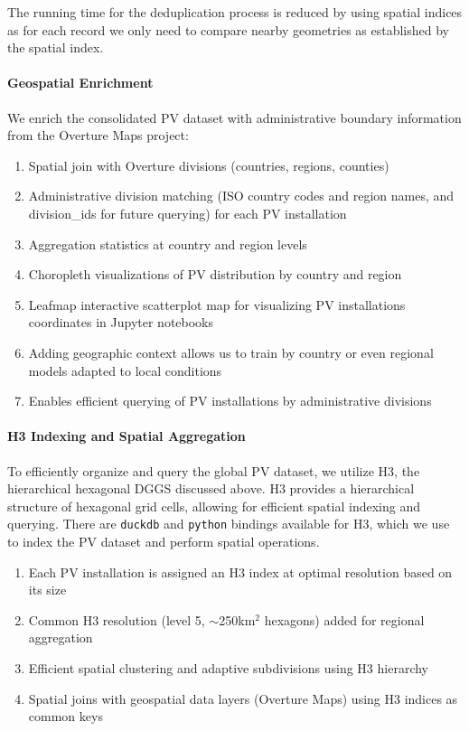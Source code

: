 \begin{multicols}{2}
The running time for the deduplication process is reduced by using spatial indices as for each record we only need to compare nearby geometries as established by the spatial index.


\paragraph{Geospatial Enrichment}
We enrich the consolidated PV dataset with administrative boundary information from the Overture Maps project:
\begin{enumerate}
    \item Spatial join with Overture divisions (countries, regions, counties)
    \item Administrative division matching (ISO country codes and region names, and division\_ids for future querying) for each PV installation
    \item Aggregation statistics at country and region levels
    \item Choropleth visualizations of PV distribution by country and region
    \item Leafmap interactive scatterplot map for visualizing PV installations coordinates in Jupyter notebooks
    \item Adding geographic context allows us to train by country or even regional models adapted to local conditions
    \item Enables efficient querying of PV installations by administrative divisions
\end{enumerate}

\paragraph{H3 Indexing and Spatial Aggregation}
To efficiently organize and query the global PV dataset, we utilize H3, the hierarchical hexagonal DGGS discussed above.
H3 provides a hierarchical structure of hexagonal grid cells, allowing for efficient spatial indexing and querying. There are \texttt{duckdb} and \texttt{python} bindings available for H3,
which we use to index the PV dataset and perform spatial operations.
\begin{enumerate}
    \item Each PV installation is assigned an H3 index at optimal resolution based on its size
    \item Common H3 resolution (level 5, $\sim$250km$^2$ hexagons) added for regional aggregation
    \item Efficient spatial clustering and adaptive subdivisions using H3 hierarchy
    \item Spatial joins with geospatial data layers (Overture Maps) using H3 indices as common keys
\end{enumerate}


\end{multicols}
